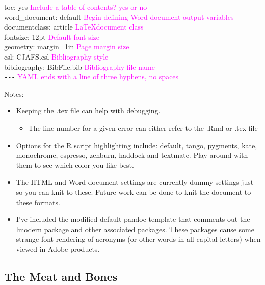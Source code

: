 \documentclass[12pt,]{article}
\providecommand{\tightlist}{%
  \setlength{\itemsep}{0pt}\setlength{\parskip}{0pt}}
\begin{document}
toc: yes \textcolor{magenta}{Include a table of contents? yes or no}\\
\hspace*{0.333em}\hspace*{0.333em} word\_document: default
\textcolor{magenta}{Begin defining Word document output variables}\\
documentclass: article \textcolor{magenta}{\LaTeX document class}\\
fontsize: 12pt \textcolor{magenta}{Default font size}\\
geometry: margin=1in \textcolor{magenta}{Page margin size}\\
csl: CJAFS.csl \textcolor{magenta}{Bibliography style}\\
bibliography: BibFile.bib \textcolor{magenta}{Bibliography file name}\\
\texttt{-\/-\/-}
\textcolor{magenta}{YAML ends with a line of three hyphens, no spaces}

Notes:

\begin{itemize}
\item
  Keeping the .tex file can help with debugging.

  \begin{itemize}
  \tightlist
  \item
    The line number for a given error can either refer to the .Rmd or
    .tex file
  \end{itemize}
\item
  Options for the R script highlighting include: default, tango,
  pygments, kate, monochrome, espresso, zenburn, haddock and textmate.
  Play around with them to see which color you like best.
\item
  The HTML and Word document settings are currently dummy settings just
  so you can knit to these. Future work can be done to knit the document
  to these formats.
\item
  I've included the modified default pandoc template that comments out
  the lmodern package and other associated packages. These packages
  cause some strange font rendering of acronyms (or other words in all
  capital letters) when viewed in Adobe products.
\end{itemize}

\subsection{The Meat and Bones}\label{the-meat-and-bones}
\end{document}
